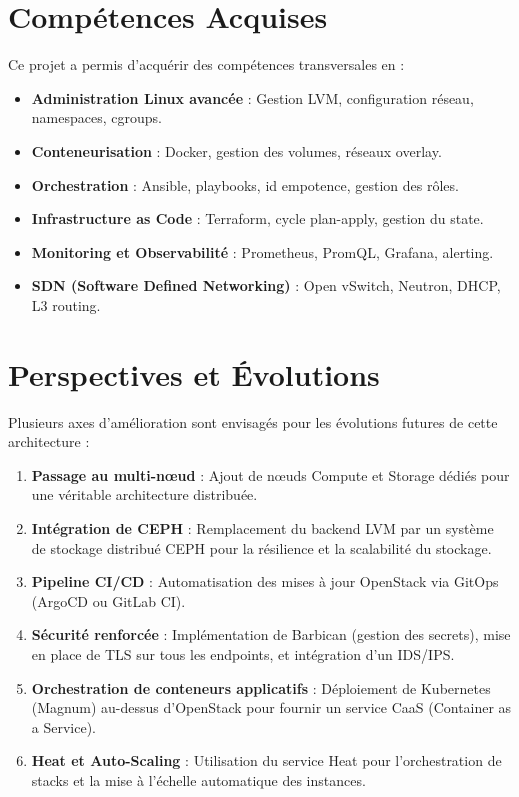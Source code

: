 \documentclass[12pt,a4paper,oneside]{book}
\begin{document}
\section*{Comp\'etences Acquises}

Ce projet a permis d'acqu\'erir des comp\'etences transversales en :
\begin{itemize}
    \item \textbf{Administration Linux avanc\'ee} : Gestion LVM, configuration r\'eseau, namespaces, cgroups.
    \item \textbf{Conteneurisation} : Docker, gestion des volumes, r\'eseaux overlay.
    \item \textbf{Orchestration} : Ansible, playbooks, id empotence, gestion des r\^oles.
    \item \textbf{Infrastructure as Code} : Terraform, cycle plan-apply, gestion du state.
    \item \textbf{Monitoring et Observabilit\'e} : Prometheus, PromQL, Grafana, alerting.
    \item \textbf{SDN (Software Defined Networking)} : Open vSwitch, Neutron, DHCP, L3 routing.
\end{itemize}

\section*{Perspectives et \'Evolutions}

Plusieurs axes d'am\'elioration sont envisag\'es pour les \'evolutions futures de cette architecture :

\begin{enumerate}
    \item \textbf{Passage au multi-n\oe{}ud} : Ajout de n\oe{}uds Compute et Storage d\'edi\'es pour une v\'eritable architecture distribu\'ee.
    \item \textbf{Int\'egration de CEPH} : Remplacement du backend LVM par un syst\`eme de stockage distribu\'e CEPH pour la r\'esilience et la scalabilit\'e du stockage.
    \item \textbf{Pipeline CI/CD} : Automatisation des mises \`a jour OpenStack via GitOps (ArgoCD ou GitLab CI).
    \item \textbf{S\'ecurit\'e renforc\'ee} : Impl\'ementation de Barbican (gestion des secrets), mise en place de TLS sur tous les endpoints, et int\'egration d'un IDS/IPS.
    \item \textbf{Orchestration de conteneurs applicatifs} : D\'eploiement de Kubernetes (Magnum) au-dessus d'OpenStack pour fournir un service CaaS (Container as a Service).
    \item \textbf{Heat et Auto-Scaling} : Utilisation du service Heat pour l'orchestration de stacks et la mise \`a l'\'echelle automatique des instances.
\end{enumerate}
\end{document}
